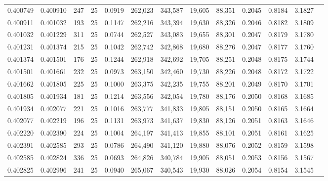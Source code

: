 \begin{tabular}{rrrrrrrrrrrrr}
0.400749 & 0.400910 &   247 &  25 &                                     0.0919 & 262,023 & 343,587 &  19,605 &  88,351 & 0.2045 & 0.8184 & 3.1827 \\
0.400911 & 0.401032 &   193 &  25 &                                     0.1147 & 262,216 & 343,394 &  19,630 &  88,326 & 0.2046 & 0.8182 & 3.1809 \\
0.401032 & 0.401229 &   311 &  25 &                                     0.0744 & 262,527 & 343,083 &  19,655 &  88,301 & 0.2047 & 0.8179 & 3.1780 \\
0.401231 & 0.401374 &   215 &  25 &                                     0.1042 & 262,742 & 342,868 &  19,680 &  88,276 & 0.2047 & 0.8177 & 3.1760 \\
0.401374 & 0.401501 &   176 &  25 &                                     0.1244 & 262,918 & 342,692 &  19,705 &  88,251 & 0.2048 & 0.8175 & 3.1744 \\
0.401501 & 0.401661 &   232 &  25 &                                     0.0973 & 263,150 & 342,460 &  19,730 &  88,226 & 0.2048 & 0.8172 & 3.1722 \\
0.401662 & 0.401805 &   225 &  25 &                                     0.1000 & 263,375 & 342,235 &  19,755 &  88,201 & 0.2049 & 0.8170 & 3.1701 \\
0.401805 & 0.401934 &   181 &  25 &                                     0.1214 & 263,556 & 342,054 &  19,780 &  88,176 & 0.2050 & 0.8168 & 3.1685 \\
0.401934 & 0.402077 &   221 &  25 &                                     0.1016 & 263,777 & 341,833 &  19,805 &  88,151 & 0.2050 & 0.8165 & 3.1664 \\
0.402077 & 0.402219 &   196 &  25 &                                     0.1131 & 263,973 & 341,637 &  19,830 &  88,126 & 0.2051 & 0.8163 & 3.1646 \\
0.402220 & 0.402390 &   224 &  25 &                                     0.1004 & 264,197 & 341,413 &  19,855 &  88,101 & 0.2051 & 0.8161 & 3.1625 \\
0.402391 & 0.402585 &   293 &  25 &                                     0.0786 & 264,490 & 341,120 &  19,880 &  88,076 & 0.2052 & 0.8159 & 3.1598 \\
0.402585 & 0.402824 &   336 &  25 &                                     0.0693 & 264,826 & 340,784 &  19,905 &  88,051 & 0.2053 & 0.8156 & 3.1567 \\
0.402825 & 0.402996 &   241 &  25 &                                     0.0940 & 265,067 & 340,543 &  19,930 &  88,026 & 0.2054 & 0.8154 & 3.1545 \\

\end{tabular}
